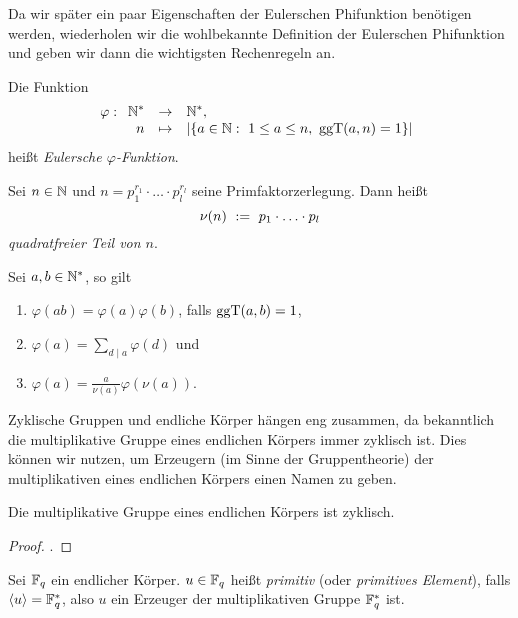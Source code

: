 Da wir später ein paar Eigenschaften der Eulerschen Phifunktion benötigen
werden, wiederholen wir die wohlbekannte Definition der Eulerschen
Phifunktion und geben wir dann die wichtigsten Rechenregeln an.


\begin{definition}
  Die Funktion
  \[ \varphi: \funcdef{\N^\ast &\to& \N^\ast,\\
    n &\mapsto& |\{ a \in \N:\ 1\leq a\leq n,\ \ggT(a,n)=1 \}|}\]
  heißt \emph{Eulersche $\varphi$-Funktion}.
\end{definition}

\begin{definition}
  Sei $n \in \mathbb{N}$ und $n = p_1^{r_1}\cdot\ldots\cdot p_l^{r_l}$ seine
  Primfaktorzerlegung. Dann heißt
  \[ \nu(n) \ :=\  p_1\cdot \ldots\cdot p_l\]
  \emph{quadratfreier Teil von $n$}.
\end{definition}


\begin{lemma}
  \label{lemma:rechenregeln_phifunktion}
  Sei $a,b\in\mathbb{N}^\ast$, so gilt
  \begin{enumerate}
    \item $\varphi(ab) = \varphi(a)\varphi(b)$, falls $\operatorname{ggT}(a,b) = 1$,
    \item $\varphi(a) = \sum_{d\mid a} \varphi(d)$ und
    \item $\varphi(a) = \tfrac{a}{\nu(a)}\varphi(\nu(a))$.
  \end{enumerate}
\end{lemma}


Zyklische Gruppen und endliche Körper hängen eng zusammen, da bekanntlich die
multiplikative Gruppe eines endlichen Körpers immer zyklisch ist. Dies können
wir nutzen, um Erzeugern (im Sinne der Gruppentheorie) der multiplikativen
eines endlichen Körpers einen Namen zu geben.

\begin{satz}
  \label{satz:mult_gruppe_endl_korper_zyklisch}
  Die multiplikative Gruppe eines endlichen Körpers ist zyklisch.
\end{satz}
\begin{proof}
  \autocite[Theorem 2.8]{lidl1997finite}.
\end{proof}


\begin{definition}[primitiv]
  \label{def:primitiv}
  Sei $\mathbb{F}_q$ ein endlicher Körper. $u\in \mathbb{F}_q$ heißt \emph{primitiv} 
  (oder \emph{primitives Element}), falls $\langle u \rangle = \mathbb{F}_q^\ast$, 
  also $u$ ein Erzeuger der multiplikativen Gruppe $\mathbb{F}_q^\ast$ ist.
\end{definition}


